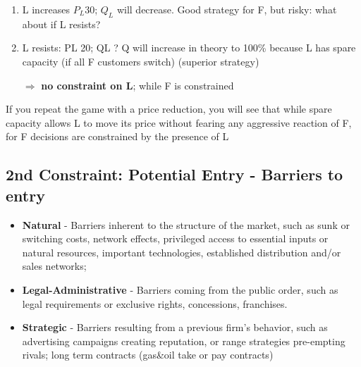 \begin{enumerate}
{\begin{itemize}
                        \begin{enumerate}
                            \item L increases $P_L 30$; $Q_L$ will decrease. Good strategy for F, but risky: what about if L resists?
                            \item L resists: PL 20; QL ? Q will increase in theory to 100\% because L has spare capacity (if all F customers switch) (superior strategy)
                            \item[\(\Rightarrow\)] \textbf{no constraint on L}; while F is constrained
                        \end{enumerate}
                \end{itemize}
                If you repeat the game with a price reduction, you will see that while spare capacity allows L to move its price without fearing any aggressive reaction of F, for F decisions are constrained by the presence of L
                }
                
    \end{enumerate}

    \subsection{2nd Constraint: Potential Entry - Barriers to entry}


        \begin{itemize}
            \item \textbf{Natural} - Barriers inherent to the structure of the market, such as sunk or switching costs, network effects, privileged access to essential inputs or natural resources, important technologies, established distribution and/or sales networks; 
            \item \textbf{Legal-Administrative} - Barriers coming from the public order, such as legal requirements or exclusive rights, concessions, franchises. 
            \item \textbf{Strategic} - Barriers resulting from a previous firm’s behavior, such as advertising campaigns creating reputation, or range strategies pre-empting rivals; long term contracts (gas\&oil take or pay contracts)
        \end{itemize}

